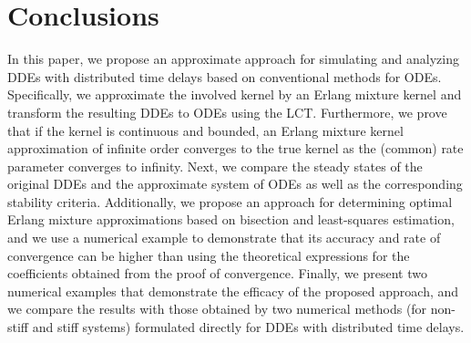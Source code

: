 \section{Conclusions}\label{sec:conclusions}
In this paper, we propose an approximate approach for simulating and analyzing DDEs with distributed time delays based on conventional methods for ODEs. Specifically, we approximate the involved kernel by an Erlang mixture kernel and transform the resulting DDEs to ODEs using the LCT. Furthermore, we prove that if the kernel is continuous and bounded, an Erlang mixture kernel approximation of infinite order converges to the true kernel as the (common) rate parameter converges to infinity. Next, we compare the steady states of the original DDEs and the approximate system of ODEs as well as the corresponding stability criteria. Additionally, we propose an approach for determining optimal Erlang mixture approximations based on bisection and least-squares estimation, and we use a numerical example to demonstrate that its accuracy and rate of convergence can be higher than using the theoretical expressions for the coefficients obtained from the proof of convergence. Finally, we present two numerical examples that demonstrate the efficacy of the proposed approach, and we compare the results with those obtained by two numerical methods (for non-stiff and stiff systems) formulated directly for DDEs with distributed time delays.
